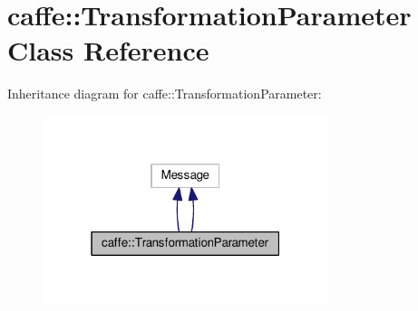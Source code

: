 \hypertarget{classcaffe_1_1_transformation_parameter}{}\section{caffe\+:\+:Transformation\+Parameter Class Reference}
\label{classcaffe_1_1_transformation_parameter}


Inheritance diagram for caffe\+:\+:Transformation\+Parameter\+:
\nopagebreak
\begin{figure}[H]
\begin{center}
\leavevmode
\includegraphics[width=235pt]{classcaffe_1_1_transformation_parameter__inherit__graph}
\end{center}
\end{figure}
